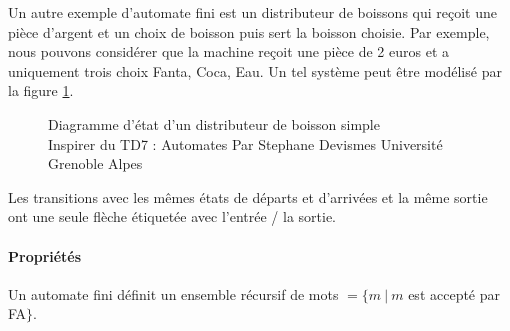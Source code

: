 Un autre exemple d'automate fini est un distributeur de boissons qui reçoit une pièce d'argent et un choix de boisson puis sert la boisson choisie. Par exemple, nous pouvons considérer que la machine reçoit une pièce de 2 euros et a uniquement trois choix Fanta, Coca, Eau. Un tel système peut être modélisé par la figure \ref{distribfig}.

\begin{figure}[h]
	\centering
	\caption{Diagramme d'état d'un distributeur de boisson simple \\{Inspirer du TD7 : Automates Par Stephane Devismes Université Grenoble Alpes}}
	\label{distribfig}
\end{figure}
Les transitions avec les mêmes états de départs et d’arrivées et la même sortie ont une seule flèche étiquetée avec l’entrée / la sortie. 

\paragraph{Propriétés}
\begin{myprop}
	Un automate fini définit un ensemble récursif de mots $=\{m \ |\ m$ est
		accepté par FA$\}$.
\end{myprop}

